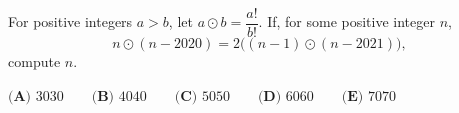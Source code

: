 For positive integers $a>b$, let $a\odot b=\dfrac{a!}{b!}$. If, for some positive integer $n$,
\[n\odot(n-2020)=2\bigl((n-1)\odot(n-2021)\bigr),\]
compute $n$.

$\textbf{(A) }3030\qquad\textbf{(B) }4040\qquad\textbf{(C) }5050\qquad\textbf{(D) }6060\qquad\textbf{(E) }7070$
